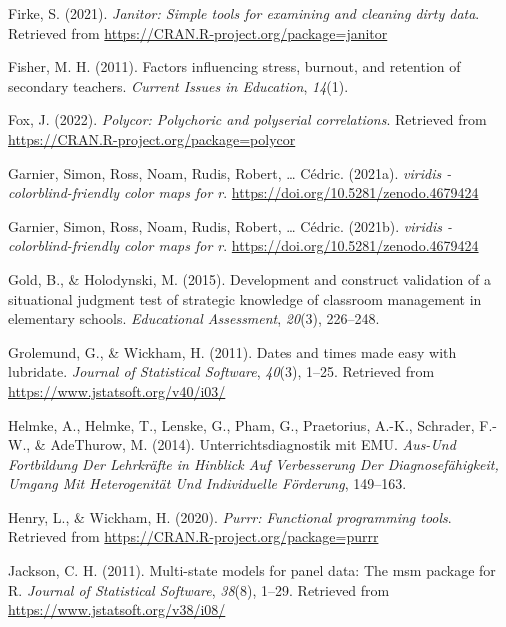 \documentclass[
  man]{apa6}
\newlength{\cslhangindent}
\newlength{\cslentryspacingunit} %
\newenvironment{CSLReferences}[2] %
 {%
  \setlength{\parindent}{0pt}
  \ifodd #1
  \let\oldpar\par
  \def\par{\hangindent=\cslhangindent\oldpar}
  \fi
  \setlength{\parskip}{#2\cslentryspacingunit}
 }%
 {}
\begin{document}
\begin{CSLReferences}{1}{0}
\leavevmode{}%
Firke, S. (2021). \emph{Janitor: Simple tools for examining and cleaning dirty data}. Retrieved from \url{https://CRAN.R-project.org/package=janitor}

\leavevmode{}%
Fisher, M. H. (2011). Factors influencing stress, burnout, and retention of secondary teachers. \emph{Current Issues in Education}, \emph{14}(1).

\leavevmode{}%
Fox, J. (2022). \emph{Polycor: Polychoric and polyserial correlations}. Retrieved from \url{https://CRAN.R-project.org/package=polycor}

\leavevmode{}%
Garnier, Simon, Ross, Noam, Rudis, Robert, \ldots{} Cédric. (2021a). \emph{{viridis} - colorblind-friendly color maps for r}. \url{https://doi.org/10.5281/zenodo.4679424}

\leavevmode{}%
Garnier, Simon, Ross, Noam, Rudis, Robert, \ldots{} Cédric. (2021b). \emph{{viridis} - colorblind-friendly color maps for r}. \url{https://doi.org/10.5281/zenodo.4679424}

\leavevmode{}%
Gold, B., \& Holodynski, M. (2015). Development and construct validation of a situational judgment test of strategic knowledge of classroom management in elementary schools. \emph{Educational Assessment}, \emph{20}(3), 226--248.

\leavevmode{}%
Grolemund, G., \& Wickham, H. (2011). Dates and times made easy with {lubridate}. \emph{Journal of Statistical Software}, \emph{40}(3), 1--25. Retrieved from \url{https://www.jstatsoft.org/v40/i03/}

\leavevmode{}%
Helmke, A., Helmke, T., Lenske, G., Pham, G., Praetorius, A.-K., Schrader, F.-W., \& AdeThurow, M. (2014). Unterrichtsdiagnostik mit EMU. \emph{Aus-Und Fortbildung Der Lehrkr{ä}fte in Hinblick Auf Verbesserung Der Diagnosef{ä}higkeit, Umgang Mit Heterogenit{ä}t Und Individuelle F{ö}rderung}, 149--163.

\leavevmode{}%
Henry, L., \& Wickham, H. (2020). \emph{Purrr: Functional programming tools}. Retrieved from \url{https://CRAN.R-project.org/package=purrr}

\leavevmode{}%
Jackson, C. H. (2011). Multi-state models for panel data: The {msm} package for {R}. \emph{Journal of Statistical Software}, \emph{38}(8), 1--29. Retrieved from \url{https://www.jstatsoft.org/v38/i08/}


\end{CSLReferences}
\end{document}

